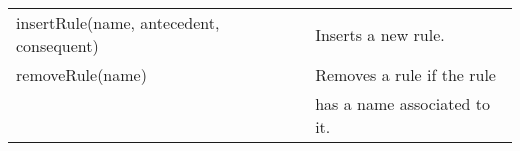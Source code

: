 \begin{center}
\begin{longtable}{l l}
  \hline 
  insertRule(name, antecedent, consequent)& Inserts a new rule.		\\
  removeRule(name)	 		& Removes a rule if the rule 	\\
					& has a name associated to it.	\\
  \hline
\end{longtable}
\end{center}